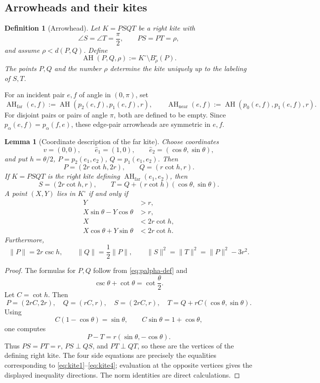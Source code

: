 \documentclass[11pt]{article}
\newtheorem{lemma}[theorem]{Lemma}
\newtheorem{definition}[theorem]{Definition}
\newcommand{\AH}{\operatorname{AH}}
\newcommand{\AHfar}{\operatorname{AH}_{\mathrm{far}}}
\newcommand{\AHnear}{\operatorname{AH}_{\mathrm{near}}}
\numberwithin{equation}{section}
\begin{document}
\subsection{Arrowheads and their kites}

\begin{definition}[Arrowhead]\label{def:arrowhead}
Let $K=PSQT$ be a right kite with
\[
\angle S=\angle T=\frac\pi2,
\qquad
PS=PT=\rho,
\]
and assume $\rho<d(P,Q)$. Define
\[
\AH(P,Q,\rho):=K^\circ\setminus B_\rho^\circ(P).
\]
The points $P,Q$ and the number $\rho$ determine the kite uniquely up to the labeling of $S,T$.
\end{definition}

For an incident pair $e,f$ of angle in $(0,\pi)$, set
\begin{equation}\label{eq:near-far-def}
\AHfar(e,f):=\AH(p_2(e,f),p_1(e,f),r),
\qquad
\AHnear(e,f):=\AH(p_0(e,f),p_1(e,f),r).
\end{equation}
For disjoint pairs or pairs of angle $\pi$, both are defined to be empty. Since $p_\alpha(e,f)=p_\alpha(f,e)$, these edge-pair arrowheads are symmetric in $e,f$.

\begin{lemma}[Coordinate description of the far kite]\label{lem:kite-coordinates}
Choose coordinates
\[
v=(0,0),
\qquad
\widehat e_1=(1,0),
\qquad
\widehat e_2=(\cos\theta,\sin\theta),
\]
and put $h=\theta/2$, $P=p_2(e_1,e_2)$, $Q=p_1(e_1,e_2)$. Then
\[
P=(2r\cot h,2r),
\qquad
Q=(r\cot h,r).
\]
If $K=PSQT$ is the right kite defining $\AHfar(e_1,e_2)$, then
\[
S=(2r\cot h,r),
\qquad
T=Q+(r\cot h)(\cos\theta,\sin\theta).
\]
A point $(X,Y)$ lies in $K^\circ$ if and only if
\begin{align}
Y&>r, \label{eq:kite1}\\
X\sin\theta-Y\cos\theta&>r, \label{eq:kite2}\\
X&<2r\cot h, \label{eq:kite3}\\
X\cos\theta+Y\sin\theta&<2r\cot h. \label{eq:kite4}
\end{align}
Furthermore,
\begin{equation}\label{eq:kite-norms}
\|P\|=2r\csc h,
\qquad
\|Q\|=\frac12\|P\|,
\qquad
\|S\|^2=\|T\|^2=\|P\|^2-3r^2.
\end{equation}
\end{lemma}

\begin{proof}
The formulas for $P,Q$ follow from \eqref{eq:palpha-def} and
\[
\csc\theta+\cot\theta=\cot\frac\theta2.
\]
Let $C=\cot h$. Then
\[
P=(2rC,2r),\quad Q=(rC,r),\quad S=(2rC,r),\quad
T=Q+rC(\cos\theta,\sin\theta).
\]
Using
\[
C(1-\cos\theta)=\sin\theta,
\qquad
C\sin\theta=1+\cos\theta,
\]
one computes
\[
P-T=r(\sin\theta,-\cos\theta).
\]
Thus $PS=PT=r$, $PS\perp QS$, and $PT\perp QT$, so these are the vertices of the defining right kite. The four side equations are precisely the equalities corresponding to \eqref{eq:kite1}--\eqref{eq:kite4}; evaluation at the opposite vertices gives the displayed inequality directions. The norm identities are direct calculations.
\end{proof}
\end{document}
